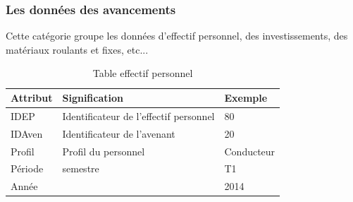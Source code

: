 \documentclass[a4paper]{report}
\begin{document}
\begin{doublespace}
    \subsubsection{Les données des avancements}
    
    Cette catégorie groupe les données d'effectif personnel, des investissements, des matériaux roulants et fixes, etc...

	\begin{table}[H]
		\begin{center}
			\begin{tabularx}{17.5cm}{|X|X|X|}
				\hline
				\textbf{Attribut} & \textbf{Signification}                 &
				\textbf{Exemple}                                                        \\
				\hline
				IDEP              & Identificateur de l'effectif personnel & 80         \\
				\hline
				IDAven            & Identificateur de l'avenant            & 20         \\
				\hline
				Profil            & Profil du personnel                    & Conducteur \\
				\hline
				Période           & semestre                               & T1         \\
				\hline
				Année             &                                        & 2014       \\
				\hline
			\end{tabularx}
			\caption{Table effectif personnel}
		\end{center}
	\end{table}


\end{doublespace}
\end{document}
